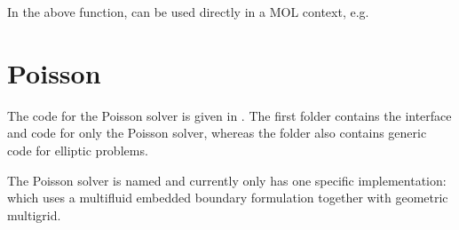 \documentclass[letterpaper,10pt,english]{sphinxmanual}
\begin{document}
In the above function,  can be used directly in a MOL context, e.g.

\begin{sphinxVerbatim}[commandchars=\\\{\},formatcom=\scriptsize]
   
          

  
                   
        
         
\end{sphinxVerbatim}


\section{Poisson}
\label{\detokenize{Poisson:poisson}}\label{\detokenize{Poisson:chap-poissonsolver}}\label{\detokenize{Poisson::doc}}
The code for the Poisson solver is given in   .
The first folder contains the interface and code for only the Poisson solver, whereas the  folder also contains generic code for elliptic problems.

The Poisson solver is named  and currently only has one specific implementation:  which uses a multifluid embedded boundary formulation together with geometric multigrid.
\end{document}
